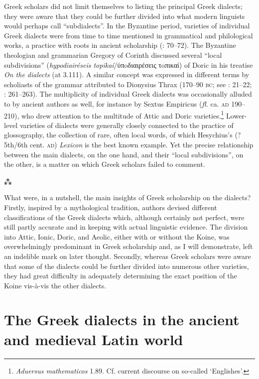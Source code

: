 Greek scholars did not limit themselves to listing the principal Greek dialects; they were aware that they could be further divided into what modern linguists would perhaps call “subdialects”. In the Byzantine period, varieties of individual Greek dialects were from time to time mentioned in grammatical and philological works, a practice with roots in ancient scholarship (\citealt{Hainsworth1967}: 70–72). The Byzantine theologian and grammarian Gregory of Corinth discussed several “local subdivisions” (\textit{hypodiairéseis topikaí}/ὑπoδιαιρέσεις τoπικαί) of Doric in his treatise \textit{On the dialects} (at 3.111). A similar concept was expressed in different terms by scholiasts of the grammar attributed to Dionysius Thrax (170–90 \textsc{bc}; see \citealt{Lambert2009}: 21–22; \citealt{VanRooy2016d}: 261–263). The multiplicity of individual Greek dialects was occasionally alluded to by ancient authors as well, for instance by Sextus Empiricus (\textit{fl.} ca. \textsc{ad} 190–210), who drew attention to the multitude of Attic and Doric varieties.\footnote{\textit{Aduersus mathematicos} 1.89. Cf. current discourse on so-called ‘Englishes’.} Lower-level varieties of dialects were generally closely connected to the practice of glossography, the collection of rare, often local words, of which Hesychius’s (?5th/6th cent. \textsc{ad}) \textit{Lexicon} is the best known example. Yet the precise relationship between the main dialects, on the one hand, and their “local subdivisions”, on the other, is a matter on which Greek scholars failed to comment.

\begin{center}
\Large⁂
\end{center}

\noindent What were, in a nutshell, the main insights of Greek scholarship on the dialects? Firstly, inspired by a mythological tradition, authors devised different classifications of the Greek dialects which, although certainly not perfect, were still partly accurate and in keeping with actual linguistic evidence. The division into Attic, Ionic, Doric, and Aeolic, either with or without the Koine, was overwhelmingly predominant in Greek scholarship and, as I will demonstrate, left an indelible mark on later thought. Secondly, whereas Greek scholars were aware that some of the dialects could be further divided into numerous other varieties, they had great difficulty in adequately determining the exact position of the Koine vis-à-vis the other dialects.

\section{The Greek dialects in the ancient and medieval Latin world}\label{sec:2.5}


